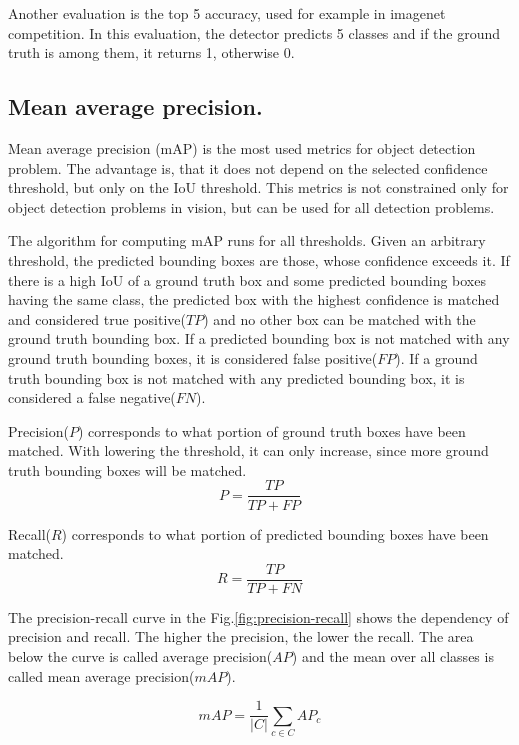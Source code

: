 \documentclass[a4paper,12pt,titlepage, twoside]{article}
\numberwithin{figure}{section}
\begin{document}
Another evaluation is the top 5 accuracy, used for example in imagenet \cite{imagenet} competition. In this evaluation, the detector predicts 5 classes and if the ground truth is among them, it returns 1, otherwise 0. 

\subsection{Mean average precision.}
Mean average precision (mAP) is the most used metrics for object detection problem. The advantage is, that it does not depend on the selected confidence threshold, but only on the IoU threshold. This metrics is not constrained only for object detection problems in vision, but can be used for all detection problems. 

The algorithm for computing mAP runs for all thresholds. Given an arbitrary threshold, the predicted bounding boxes are those, whose confidence exceeds it. If there is a high IoU of a ground truth box and some predicted bounding boxes having the same class, the predicted box with the highest confidence is matched and considered true positive($TP$) and no other box can be matched with the ground truth bounding box. If a predicted bounding box is not matched with any ground truth bounding boxes, it is considered false positive($FP$). If a ground truth bounding box is not matched with any predicted bounding box, it is considered a false negative($FN$).

Precision($P$) corresponds to what portion of ground truth boxes have been matched. With lowering the threshold, it can only increase, since more ground truth bounding boxes will be matched.
\begin{equation}
P = \frac{TP}{TP + FP}
\end{equation}

Recall($R$) corresponds to what portion of predicted bounding boxes have been matched. 
\begin{equation}
R = \frac{TP}{TP + FN}
\end{equation}

The precision-recall curve in the Fig.\ref{fig:precision-recall} shows the dependency of precision and recall. The higher the precision, the lower the recall. The area below the curve is called average precision($AP$) and the mean over all classes is called mean average precision($mAP$).

\begin{equation}
mAP = \frac{1}{|C|} \sum_{c \in C} AP_c
\end{equation}
\end{document}
